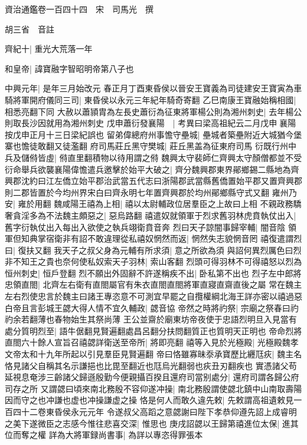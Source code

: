 資治通鑑卷一百四十四　宋　司馬光　撰

胡三省　音註

齊紀十|{
	重光大荒落一年}


和皇帝|{
	諱寶融字智昭明帝第八子也}


中興元年|{
	是年三月始改元}
春正月丁酉東昏侯以晉安王寶義為司徒建安王寶寅為車騎將軍開府儀同三司|{
	東昏侯以永元三年紀年騎奇寄翻}
乙巳南康王寶融始稱相國|{
	相悉亮翻下同}
大赦以蕭頴胄為左長史蕭衍為征東將軍楊公則為湘州刺史|{
	去年楊公則取長沙因就用為湘州刺史}
戊申蕭衍發襄陽　|{
	考異曰梁高祖紀云二月戊申襄陽按戊申正月十三日梁紀誤也}
留弟偉總府州事憺守壘城|{
	壘城者築壘附近大城猶今堡寨也憺徒敢翻又徒濫翻}
府司馬莊丘黑守樊城|{
	莊丘黑盖為征東府司馬}
衍既行州中兵及儲偫皆虛|{
	偫直里翻積物以待用謂之偫}
魏興太守裴師仁齊興太守顏僧都並不受衍命舉兵欲襲襄陽偉憺遣兵邀擊於始平大破之|{
	齊分魏興郡東界鄖鄉錫二縣地為齊興郡沈約曰江左僑立始平郡治武當五代志曰浙陽郡武當縣舊僑置始平郡又置齊興郡則二郡皆置於今均州界宋白曰齊永明七年置齊興郡於均州鄖鄉縣守式又翻}
雍州乃安|{
	雍於用翻}
魏咸陽王禧為上相|{
	禧以太尉輔政位居羣臣之上故曰上相}
不親政務驕奢貪淫多為不法魏主頗惡之|{
	惡烏路翻}
禧遣奴就領軍于烈求舊羽林虎賁執仗出入|{
	舊字衍執仗出入每出入欲使之執兵翊衛賁音奔}
烈曰天子諒闇事歸宰輔|{
	闇音陰}
領軍但知典掌宿衛非有詔不敢違理從私禧奴惘然而返|{
	惘然失志貌惘音罔}
禧復遣謂烈曰|{
	復扶又翻}
我天子之叔父身為元輔有所求須|{
	意之所欲為須}
與詔何異烈厲色曰烈非不知王之貴也奈何使私奴索天子羽林|{
	索山客翻}
烈頭可得羽林不可得禧怒以烈為恒州刺史|{
	恒戶登翻}
烈不願出外固辭不許遂稱疾不出|{
	卧私第不出也}
烈子左中郎將忠領直閤|{
	北齊左右衛有直閤屬官有朱衣直閤直閤將軍直寢直齋直後之屬}
常在魏主左右烈使忠言於魏主曰諸王專恣意不可測宜早罷之自攬權綱北海王詳亦密以禧過惡白帝且言彭城王勰大得人情不宜久輔政|{
	勰音協}
帝然之時將礿祭|{
	宗廟之祭春曰礿礿余若翻薄也春物始生其祭尚薄}
王公並齋於廟東坊帝夜使于忠語烈明旦入見當有處分質明烈至|{
	語牛倨翻見賢遍翻處昌呂翻分扶問翻質正也質明天正明也}
帝命烈將直閤六十餘人宣旨召禧勰詳衛送至帝所|{
	將即亮翻}
禧等入見於光極殿|{
	光極殿魏孝文帝太和十九年所起以引見羣臣見賢遍翻}
帝曰恪雖寡昧沗承寶歷比纒尫疢|{
	魏主名恪見諸父自稱其名示謙挹也比毘至翻近也尫烏光翻弱也疢丑刃翻疾也}
實憑諸父苟延視息奄涉三齡諸父歸遜殷勤今便親攝百揆且還府司當别處分|{
	還府司謂各歸公府司存之所}
又謂勰曰頃來南北務殷不容仰遂冲操|{
	南北務殷謂使勰北鎮中山南取壽陽因而守之也冲謙也虚也冲操謙虚之操}
恪是何人而敢久違先敕|{
	先敕謂高祖遺敕見一百四十二卷東昏侯永元元年}
令遂叔父高蹈之意勰謝曰陛下孝恭仰遵先詔上成睿明之美下遂微臣之志感今惟往悲喜交深|{
	惟思也}
庚戌詔勰以王歸第禧進位太保|{
	進其位而奪之權}
詳為大將軍録尚書事|{
	為詳以專恣得罪張本}
